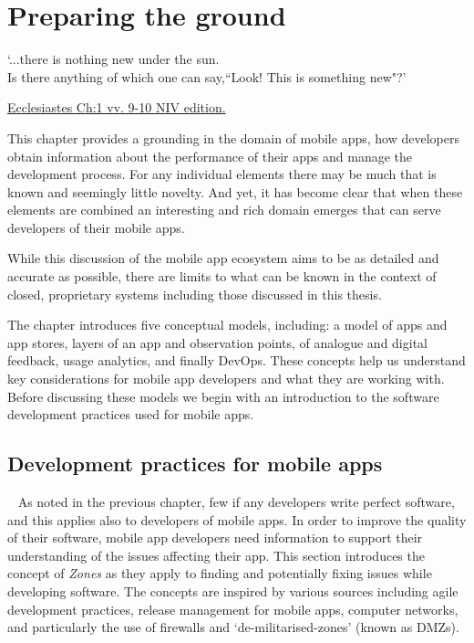 \setchapterpreamble[u]{\margintoc}
\chapter{Preparing the ground}
\label{chapter-preparing-the-ground}

\epigraph{`...there is nothing new under the sun. \\Is there anything of which one can say,``Look! This is something new"?'}{\href{https://www.biblegateway.com/passage/?search=Ecclesiastes+1\%3A9-10&version=NIV}{Ecclesiastes Ch:1 vv. 9-10 NIV edition.}}

\vspace{10mm}

This chapter provides a grounding in the domain of mobile apps, how developers obtain information about the performance of their apps and manage the development process.  For any individual elements there may be much that is known and seemingly little novelty. And yet, it has become clear that when these elements are combined an interesting and rich domain emerges that can serve developers of their mobile apps.

While this discussion of the mobile app ecosystem aims to be as detailed and accurate as possible, there are limits to what can be known in the context of closed, proprietary systems including those discussed in this thesis. 

The chapter introduces five conceptual models, including: a model of apps and app stores, layers of an app and observation points, of analogue and digital feedback, usage analytics, and finally DevOps. These concepts help us understand key considerations for mobile app developers and what they are working with. Before discussing these models we begin with an introduction to the software development practices used for mobile apps.



\section{Development practices for mobile apps}~\label{ptg-development-practices-section}
As noted in the previous chapter, few if any developers write perfect software, and this applies also to developers of mobile apps. In order to improve the quality of their software, mobile app developers need information to support their understanding of the issues affecting their app. This section introduces the concept of \emph{Zones} as they apply to finding and potentially fixing issues while developing software. The concepts are inspired by various sources including agile development practices, release management for mobile apps, computer networks, and particularly the use of firewalls and `de-militarised-zones' (known as DMZs). 

